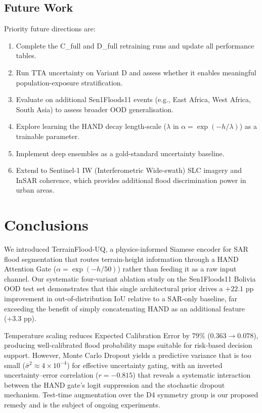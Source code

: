 \documentclass[12pt]{article}
\begin{document}
\subsection{Future Work}

Priority future directions are:
\begin{enumerate}
  \item Complete the C\_full and D\_full retraining runs and update all
        performance tables.
  \item Run TTA uncertainty on Variant D and assess whether it enables
        meaningful population-exposure stratification.
  \item Evaluate on additional Sen1Floods11 events (e.g., East Africa,
        West Africa, South Asia) to assess broader OOD generalisation.
  \item Explore learning the HAND decay length-scale ($\lambda$ in
        $\alpha = \exp(-h/\lambda)$) as a trainable parameter.
  \item Implement deep ensembles as a gold-standard uncertainty baseline.
  \item Extend to Sentinel-1 IW (Interferometric Wide-swath) SLC imagery
        and InSAR coherence, which provides additional flood discrimination
        power in urban areas.
\end{enumerate}

\section{Conclusions}
\label{sec:conclusions}

We introduced TerrainFlood-UQ, a physics-informed Siamese encoder for
SAR flood segmentation that routes terrain-height information through a
HAND Attention Gate ($\alpha = \exp(-h/50)$) rather than feeding it as a
raw input channel.  Our systematic four-variant ablation study on the
Sen1Floods11 Bolivia OOD test set demonstrates that this single
architectural prior drives a $+22.1$ pp improvement in out-of-distribution
IoU relative to a SAR-only baseline, far exceeding the benefit of simply
concatenating HAND as an additional feature (+3.3 pp).

Temperature scaling reduces Expected Calibration Error by 79\%
($0.363 \to 0.078$), producing well-calibrated flood probability maps suitable
for risk-based decision support.  However, Monte Carlo Dropout yields a
predictive variance that is too small ($\bar{\sigma}^2 \approx 4\times
10^{-4}$) for effective uncertainty gating, with an inverted uncertainty–error
correlation ($r=-0.815$) that reveals a systematic interaction between the
HAND gate's logit suppression and the stochastic dropout mechanism.  Test-time
augmentation over the D4 symmetry group is our proposed remedy and is the
subject of ongoing experiments.
\end{document}
